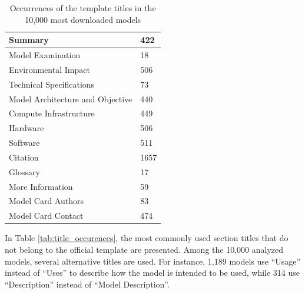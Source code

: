 \documentclass[12pt,a4paper, oneside, openright]{book}
\begin{document}
\begin{table}[h!]
\begin{tabular}{|p{9cm}|p{4cm}|}
           Summary  
           & 422
        \\ \hline
           Model Examination 
           & 18
        \\ \hline  
           Environmental Impact         
           & 506
        \\ \hline
           Technical Specifications  
           & 73
        \\ \hline
           Model Architecture and Objective 
           & 440
        \\ \hline 
           Compute Infrastructure         
           & 449
        \\ \hline
           Hardware 
           & 506
        \\ \hline
           Software 
           & 511
        \\ \hline 
           Citation       
           & 1657
        \\ \hline
           Glossary  
           & 17
        \\ \hline
           More Information  
           & 59
        \\ \hline
            Model Card Authors    
           & 83
        \\ \hline
           Model Card Contact  
           & 474
        \\ \hline

    \end{tabular}
\caption{Occurrences of the template titles in the
10,000 most downloaded models}
    \label{tab:title_occurences_template}
\end{table}

\clearpage
In Table \ref{tab:title_occurences}, the most commonly used section titles that do not belong to the official template are presented. Among the 10,000 analyzed models, several alternative titles are used. For instance, 1,189 models use ``Usage'' instead of ``Uses'' to describe how the model is intended to be used, while 314 use ``Description'' instead of ``Model Description''.
\end{document}
